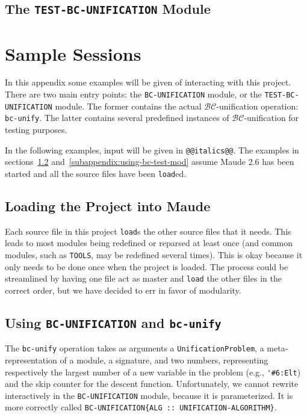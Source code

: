 \documentclass[11pt]{article}
\newcommand{\BC}{\mathcal{BC}}
\begin{document}
\subsection{The \lstinline|TEST-BC-UNIFICATION| Module}\label{subappendix:test-mod}


\newpage
\section{Sample Sessions}\label{appendix:samples}
In this appendix some examples will be given of interacting with this project.
There are two main entry points: the \lstinline|BC-UNIFICATION| module, or the
\lstinline|TEST-BC-UNIFICATION| module. The former contains the actual
$\BC$-unification operation: \lstinline|bc-unify|. The latter contains several
predefined instances of $\BC$-unification for testing purposes.

In the following examples, input will be given in \lstinline|@@italics@@|. The
examples in sections~\ref{subappendix:using-bc-unif-mod}
and~\ref{subappendix:using-bc-test-mod} assume Maude 2.6 has been started and
all the source files have been \lstinline|load|ed.

\subsection{Loading the Project into Maude}\label{subappendix:loading}

Each source file in this project \lstinline|load|s the other source files that
it needs. This leads to most modules being redefined or reparsed at least once
(and common modules, such as \lstinline|TOOLS|, may be redefined several
times). This is okay because it only needs to be done once when the project is
loaded. The process could be streamlined by having one file act as master and
\lstinline|load| the other files in the correct order, but we have decided to
err in favor of modularity.
\vspace{1ex}



\subsection{Using \lstinline|BC-UNIFICATION| and \lstinline|bc-unify|}
\label{subappendix:using-bc-unif-mod}

The \lstinline|bc-unify| operation takes as arguments a
\lstinline|UnificationProblem|, a meta-representation of a module, a signature,
and two numbers, representing respectively the largest number of a new variable
in the problem (e.g., \lstinline|'#6:Elt|) and the skip counter for the descent
function. Unfortunately, we cannot rewrite interactively in the
\lstinline|BC-UNIFICATION| module, because it is parameterized. It is more
correctly called \lstinline|BC-UNIFICATION{ALG :: UNIFICATION-ALGORITHM}|.
\end{document}
